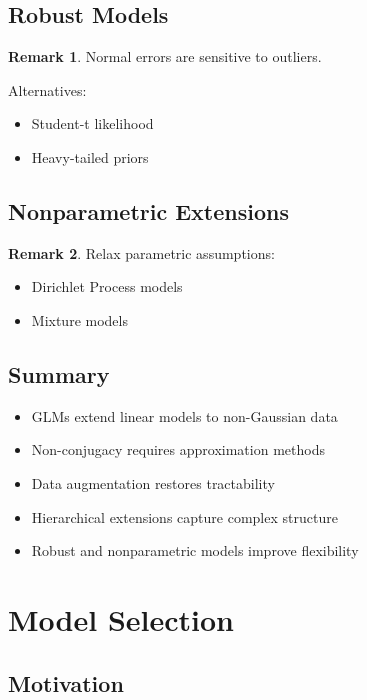 \documentclass[12pt,oneside]{book}
\numberwithin{equation}{section}
\theoremstyle{definition}
\newtheorem{remark}{Remark}[section]
\theoremstyle{plain}
\theoremstyle{remark}
\begin{document}
\section{Robust Models}

\begin{remark}
Normal errors are sensitive to outliers.

Alternatives:
\begin{itemize}
\item Student-t likelihood
\item Heavy-tailed priors
\end{itemize}
\end{remark}

\section{Nonparametric Extensions}

\begin{remark}
Relax parametric assumptions:
\begin{itemize}
\item Dirichlet Process models
\item Mixture models
\end{itemize}
\end{remark}

\section{Summary}

\begin{itemize}
\item GLMs extend linear models to non-Gaussian data
\item Non-conjugacy requires approximation methods
\item Data augmentation restores tractability
\item Hierarchical extensions capture complex structure
\item Robust and nonparametric models improve flexibility
\end{itemize}

\chapter{Model Selection}

\section{Motivation}
\end{document}
